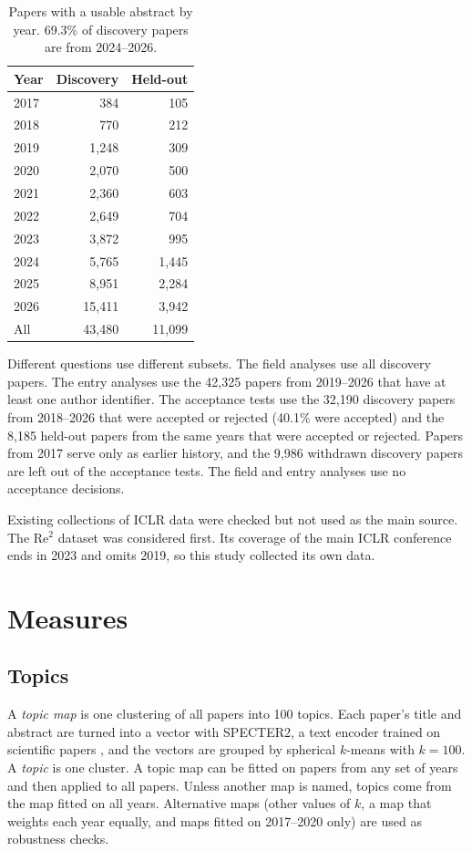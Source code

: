 \begin{table}[tb]
\centering
\footnotesize
\begin{tabular}{@{}lrr@{}}
\toprule
Year & Discovery & Held-out \\
\midrule
2017 & 384 & 105 \\
2018 & 770 & 212 \\
2019 & 1,248 & 309 \\
2020 & 2,070 & 500 \\
2021 & 2,360 & 603 \\
2022 & 2,649 & 704 \\
2023 & 3,872 & 995 \\
2024 & 5,765 & 1,445 \\
2025 & 8,951 & 2,284 \\
2026 & 15,411 & 3,942 \\
\midrule
All & 43,480 & 11,099 \\
\bottomrule
\end{tabular}
\caption[Papers by year]{Papers with a usable abstract by year. 69.3\% of discovery papers are from 2024--2026.}
\label{tab:years}
\end{table}

Different questions use different subsets. The field analyses use all discovery papers. The entry analyses use the
42,325 papers from 2019--2026 that have at least one author identifier. The acceptance tests use the 32,190 discovery
papers from 2018--2026 that were accepted or rejected (40.1\% were accepted) and the 8,185 held-out papers from the same
years that were accepted or rejected. Papers from 2017 serve only as earlier history, and the 9,986 withdrawn discovery
papers are left out of the acceptance tests. The field and entry analyses use no acceptance decisions.

Existing collections of ICLR data were checked but not used as the main source. The Re$^2$ dataset
\citep{zhang2025re2} was considered first. Its coverage of the main ICLR conference ends in 2023 and omits 2019, so this
study collected its own data.

\section{Measures}
\label{sec:measures}

\subsection{Topics}
A \emph{topic map} is one clustering of all papers into 100 topics. Each paper's title and abstract are turned into a
vector with SPECTER2, a text encoder trained on scientific papers \citep{cohan2020specter,singh2023scirepeval}, and the
vectors are grouped by spherical $k$-means with $k = 100$. A \emph{topic} is one cluster. A topic map can be fitted on
papers from any set of years and then applied to all papers. Unless another map is named, topics come from the map
fitted on all years. Alternative maps (other values of $k$, a map that weights each year equally, and maps fitted on
2017--2020 only) are used as robustness checks.

